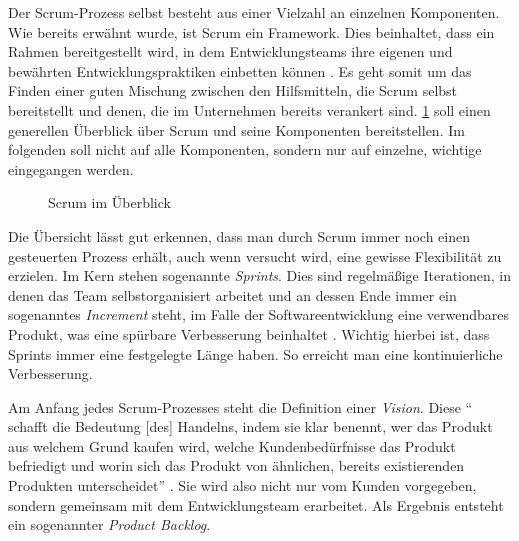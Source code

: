Der Scrum-Prozess selbst besteht aus einer Vielzahl an einzelnen Komponenten. Wie bereits erwähnt wurde, ist Scrum ein Framework. Dies beinhaltet, dass ein Rahmen bereitgestellt wird, in dem Entwicklungsteams ihre eigenen und bewährten Entwicklungspraktiken einbetten können \cite[S. 27]{wirdemann_scrum_2017}. Es geht somit um das Finden einer guten Mischung zwischen den Hilfsmitteln, die Scrum selbst bereitstellt und denen, die im Unternehmen bereits verankert sind. \ref{fig:scrum} soll einen generellen Überblick über Scrum und seine Komponenten bereitstellen. Im folgenden soll nicht auf alle Komponenten, sondern nur auf einzelne, wichtige eingegangen werden.

\begin{figure}[H]
	\centering
	\caption[Scrum im Überblick]{Scrum im Überblick \protect \cite[S. 29]{wirdemann_scrum_2017}}
	\label{fig:scrum}
\end{figure}

Die Übersicht lässt gut erkennen, dass man durch Scrum immer noch einen gesteuerten Prozess erhält, auch wenn versucht wird, eine gewisse  Flexibilität zu erzielen. Im Kern stehen sogenannte \textit{Sprints}. Dies sind regelmäßige Iterationen, in denen das Team selbstorganisiert arbeitet und an dessen Ende immer ein sogenanntes \textit{Increment} steht, im Falle der Softwareentwicklung eine verwendbares Produkt, was eine spürbare  Verbesserung beinhaltet \cite[S. 30]{wirdemann_scrum_2017}. Wichtig hierbei ist, dass Sprints immer eine festgelegte Länge haben. So erreicht man eine kontinuierliche Verbesserung.

Am Anfang jedes  Scrum-Prozesses steht die Definition einer \textit{Vision}. Diese `` schafft die Bedeutung [des] Handelns, indem sie klar benennt, wer das Produkt aus welchem Grund kaufen wird, welche Kundenbedürfnisse das Produkt befriedigt und worin sich das Produkt von ähnlichen, bereits existierenden Produkten unterscheidet'' \cite[S. 29]{wirdemann_scrum_2017}. Sie wird also nicht nur vom Kunden vorgegeben, sondern gemeinsam mit dem Entwicklungsteam erarbeitet. Als Ergebnis entsteht ein sogenannter \textit{Product Backlog}.

